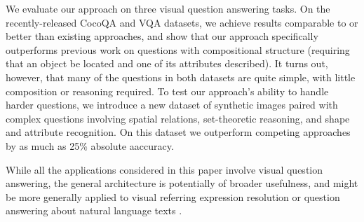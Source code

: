 




We evaluate our approach on three visual question answering tasks. On the
recently-released CocoQA \cite{yu15arxiv} and VQA \cite{antol15iccv} datasets,
we achieve results comparable to or better than existing approaches, and show
that our approach specifically outperforms previous work on questions with
compositional structure (\eg requiring that an object be located and one of its
attributes described). It turns out, however, that many of the questions in both
datasets are quite simple, with little composition or reasoning required. To
test our approach's ability to handle harder questions, we introduce
a new dataset of synthetic images paired with complex questions involving
spatial relations, set-theoretic reasoning, and shape and attribute recognition.
On this dataset we outperform competing approaches by as much as 25\% absolute
aaccuracy.

While all the applications considered in this paper involve visual question
answering, the general architecture is potentially of broader usefulness, and
might be more generally applied to visual referring expression resolution
\cite{FitzGerald13Referring} or question answering about natural language texts
\cite{Iyyer14Factoid}.


